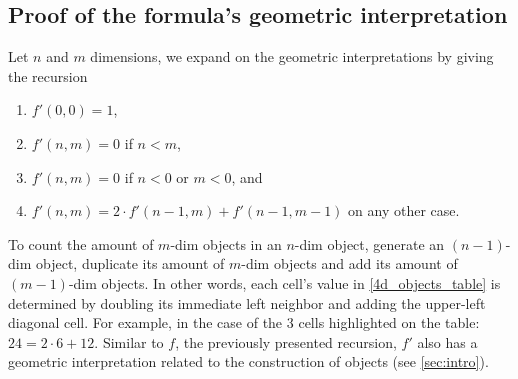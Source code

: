 \documentclass{article}
\begin{document}
	
	\subsection{Proof of the formula's geometric interpretation}
	
	Let $n$ and $m$ dimensions, we expand on the geometric interpretations by giving the recursion \cite{coxeter1973regular}
	\begin{enumerate}
		\item $f'(0,0) = 1$,
		
		\item $f'(n,m) = 0$ if $n < m$,
		
		\item $f'(n,m) = 0$ if $n < 0$ or $m < 0$, and
		
		\item $f'(n,m) = 2 \cdot f'(n-1, m) + f'(n-1, m-1)$ on any other case.
	\end{enumerate}
	
	To count the amount of $m$-dim objects in an $n$-dim object, generate an $(n-1)$-dim object, duplicate its amount of $m$-dim objects and add its amount of $(m-1)$-dim objects. In other words, each cell's value in \autoref{4d_objects_table} is determined by doubling its immediate left neighbor and adding the upper-left diagonal cell. For example, in the case of the $3$ cells highlighted on the table: $24 = 2 \cdot 6 + 12$. Similar to $f$, the previously presented recursion, $f'$ also has a geometric interpretation related to the construction of objects (see \autoref{sec:intro}).
	
\end{document}

